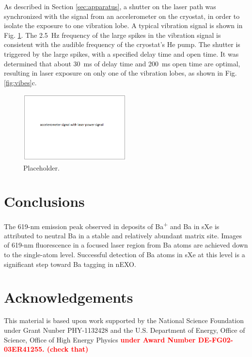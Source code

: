 \documentclass[aps,pra,reprint,superscriptaddress]{revtex4-1}
\begin{document}
As described in Section \ref{sec:apparatus}, a shutter on the laser path was synchronized with the signal from an accelerometer on the cryostat, in order to isolate the exposure to one vibration lobe.  A typical vibration signal is shown in Fig. \ref{fig:vibeSig}.  The 2.5~Hz frequency of the large spikes in the vibration signal is consistent with the audible frequency of the cryostat's He pump.  The shutter is triggered by the large spikes, with a specified delay time and open time.  It was determined that about 30~ms of delay time and 200~ms open time are optimal, resulting in laser exposure on only one of the vibration lobes, as shown in Fig. \ref{fig:vibes}c.

\begin{figure}
\includegraphics[width=0.5\textwidth]{figures/vibe_accerlometerSig.png}
\caption{Placeholder.}
\label{fig:vibeSig}
\end{figure}

\section{Conclusions}

The 619-nm emission peak observed in deposits of Ba\textsuperscript{+} and Ba in sXe is attributed to neutral Ba in a stable and relatively abundant matrix site.
Images of 619-nm fluorescence in a focused laser region from Ba atoms are achieved down to the single-atom level.  Successful detection of Ba atoms in sXe at this level is a significant step toward Ba tagging in nEXO. 

\section*{Acknowledgements}

This material is based upon work supported by the National Science Foundation under Grant Nunber PHY-1132428 and the U.S. Department of Energy, Office of Science, Office of High Energy Physics \textbf{\textcolor{red}{under Award Number DE-FG02-03ER41255. (check that)}}
\end{document}
